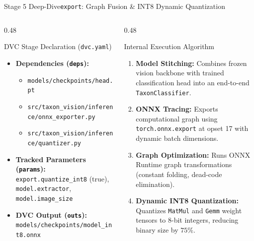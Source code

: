 \begin{frame}{Stage 5 Deep-Dive}{\texttt{export}: Graph Fusion \& INT8 Dynamic Quantization}
\begin{columns}[T]
\begin{column}{0.48\textwidth}
\begin{block}{DVC Stage Declaration (\texttt{dvc.yaml})}
\begin{itemize}
                        \texttt{--quantize-int8 --quantize-mode dynamic} \newline
                        \texttt{--quantized-output model\_int8.onnx}
                    \item \textbf{Dependencies (\texttt{deps}):}
                        \begin{itemize}\tiny
                            \item \texttt{models/checkpoints/head.pt}
                            \item \texttt{src/taxon\_vision/inference/onnx\_exporter.py}
                            \item \texttt{src/taxon\_vision/inference/quantizer.py}
                        \end{itemize}
                    \item \textbf{Tracked Parameters (\texttt{params}):}
                        \texttt{export.quantize\_int8} (true), \newline
                        \texttt{model.extractor}, \texttt{model.image\_size}
                    \item \textbf{DVC Output (\texttt{outs}):}
                        \texttt{models/checkpoints/model\_int8.onnx}
                \end{itemize}
            \end{block}
        \end{column}
        \begin{column}{0.48\textwidth}
            \begin{block}{Internal Execution Algorithm}
                \begin{enumerate}\scriptsize
                    \item \textbf{Model Stitching:} Combines frozen vision backbone with trained classification head into an end-to-end \texttt{TaxonClassifier}.
                    \item \textbf{ONNX Tracing:} Exports computational graph using \texttt{torch.onnx.export} at opset 17 with dynamic batch dimensions.
                    \item \textbf{Graph Optimization:} Runs ONNX Runtime graph transformations (constant folding, dead-code elimination).
                    \item \textbf{Dynamic INT8 Quantization:} Quantizes \texttt{MatMul} and \texttt{Gemm} weight tensors to 8-bit integers, reducing binary size by $75\%$.
                \end{enumerate}
            \end{block}
        \end{column}
    \end{columns}



\end{frame}
